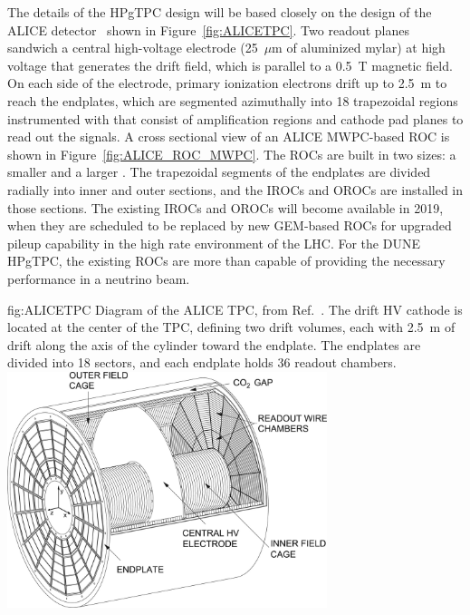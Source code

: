 The details of the HPgTPC design will be based closely on the design of the ALICE detector~\cite{Dellacasa:2000bm} shown in Figure~\ref{fig:ALICETPC}. Two readout planes sandwich a central high-voltage electrode (25~$\mu$m of aluminized mylar) at high voltage that generates the drift field, which is parallel to a \SI{0.5}{T} magnetic field. On each side of the electrode, primary ionization electrons drift up to \SI{2.5}{m} to reach the endplates, which are segmented azimuthally into 18 trapezoidal regions instrumented with  that consist of  amplification regions and cathode pad planes to read out the signals. A cross sectional view of an ALICE MWPC-based ROC is shown in Figure~\ref{fig:ALICE_ROC_MWPC}. The ROCs are built in two sizes: a smaller  and a larger . The trapezoidal segments of the endplates are divided radially into inner and outer sections, and the IROCs and OROCs are installed in those sections. The existing IROCs and OROCs will become available in 2019, when they are scheduled to be replaced by new GEM-based ROCs for upgraded pileup capability in the high rate environment of the LHC. For the DUNE HPgTPC, the existing ROCs are more than capable of providing the necessary performance in a neutrino beam.  

\begin{dunefigure}{fig:ALICETPC}
{Diagram of the ALICE TPC, from Ref.~\cite{Alme:2010ke}. The drift HV cathode is located at the center of the TPC, defining two drift volumes, each with 2.5~m of drift along the axis of the cylinder toward the endplate. The endplates are divided into 18 sectors, and each endplate holds 36 readout chambers.}
    \includegraphics[width=0.7\textwidth]{graphics/alice_tpc_highres.jpg}
\end{dunefigure}


